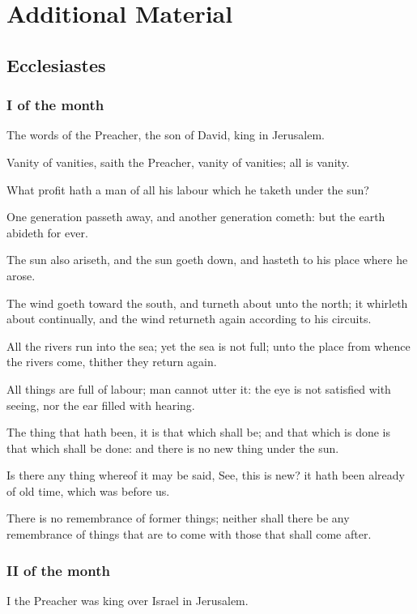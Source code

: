 \documentclass[0main.tex]{subfiles}
\begin{document}
\part{Additional Material}

\chapter{Ecclesiastes}

\section*{I of the month}

The words of the Preacher, the son of David, king in Jerusalem.

Vanity of vanities, saith the Preacher, vanity of vanities; all is vanity.

What profit hath a man of all his labour which he taketh under the sun?

One generation passeth away, and another generation cometh: but the earth abideth for ever.

The sun also ariseth, and the sun goeth down, and hasteth to his place where he arose.

The wind goeth toward the south, and turneth about unto the north; it whirleth about continually, and the wind returneth again according to his circuits.

All the rivers run into the sea; yet the sea is not full; unto the place from whence the rivers come, thither they return again.

All things are full of labour; man cannot utter it: the eye is not satisfied with seeing, nor the ear filled with hearing.

The thing that hath been, it is that which shall be; and that which is done is that which shall be done: and there is no new thing under the sun.

Is there any thing whereof it may be said, See, this is new? it hath been already of old time, which was before us.

There is no remembrance of former things; neither shall there be any remembrance of things that are to come with those that shall come after.

\section*{II of the month}

I the Preacher was king over Israel in Jerusalem.
\end{document}
